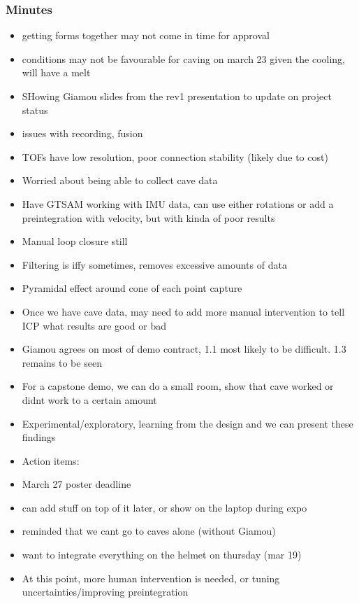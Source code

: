 		\subsubsection*{Minutes}
			\begin{itemize}
				\item getting forms together may not come in time for approval
				\item conditions may not be favourable for caving on march 23 given the cooling, will have a melt
				\item SHowing Giamou slides from the rev1 presentation to update on project status
				\item issues with recording, fusion
				\item TOFs have low resolution, poor connection stability (likely due to cost)
				\item Worried about being able to collect cave data
				\item Have GTSAM working with IMU data, can use either rotations or add a preintegration with velocity, but with kinda of poor results
				\item Manual loop closure still
				\item Filtering is iffy sometimes, removes excessive amounts of data
				\item Pyramidal effect around cone of each point capture
				\item Once we have cave data, may need to add more manual intervention to tell ICP what results are good or bad
				\item Giamou agrees on most of demo contract, 1.1 most likely to be difficult. 1.3 remains to be seen
				\item For a capstone demo, we can do a small room, show that cave worked or didnt work to a certain amount
				\item Experimental/exploratory, learning from the design and we can present these findings
				\item Action items:
				\item March 27 poster deadline
				\item can add stuff on top of it later, or show on the laptop during expo
				\item reminded that we cant go to caves alone (without Giamou)
				\item want to integrate everything on the helmet on thursday (mar 19)
				\item At this point, more human intervention is needed, or tuning uncertainties/improving preintegration

\end{itemize}
